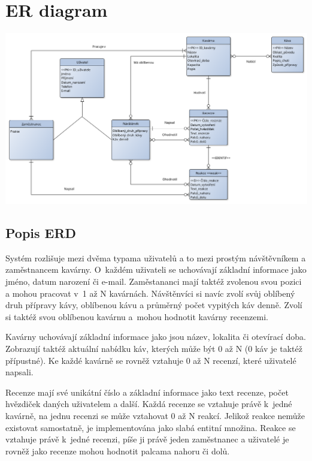 \documentclass[a4paper, 11pt]{article}
\begin{document}
\newpage
\section{ER diagram}
\begin{center}
			\includegraphics[width=1\linewidth]{./IDS_ER.png} \\
            \label{ER}
\end{center}

\subsection{Popis ERD}
Systém rozlišuje mezi dvěma typama uživatelů a to mezi prostým návštěvníkem a zaměstnancem kavárny. O~každém uživateli se uchovávají základní informace jako jméno, datum narození či e-mail. Zaměstananci mají taktéž zvolenou svou pozici a mohou pracovat v~1 až N kavárnách. Návštěnvíci si navíc zvolí svůj oblíbený druh přípravy kávy, oblíbenou kávu a průměrný počet vypitých káv denně. Zvolí si taktéž svou oblíbenou kavárnu a~mohou hodnotit kavárny recenzemi.

\noindent Kavárny uchovávají základní informace jako jsou název, lokalita či otevírací doba. Zobrazují taktéž aktuální nabídku káv, kterých může být 0 až N (0 káv je taktéž přípustné). Ke každé kavárně se rovněž vztahuje 0 až N recenzí, které uživatelé napsali.

\noindent Recenze mají své unikátní číslo a základní informace jako text recenze, počet hvězdiček daných uživatelem a další. Každá recenze se vztahuje právě k~jedné kavárně, na jednu recenzi se může vztahovat 0 až N reakcí. Jelikož reakce nemůže existovat samostatně, je implementována jako slabá entitní množina. Reakce se vztahuje právě k~jedné recenzi, píše ji právě jeden zaměstnanec a uživatelé je rovněž jako recenze mohou hodnotit palcama nahoru či dolů.
\end{document}
